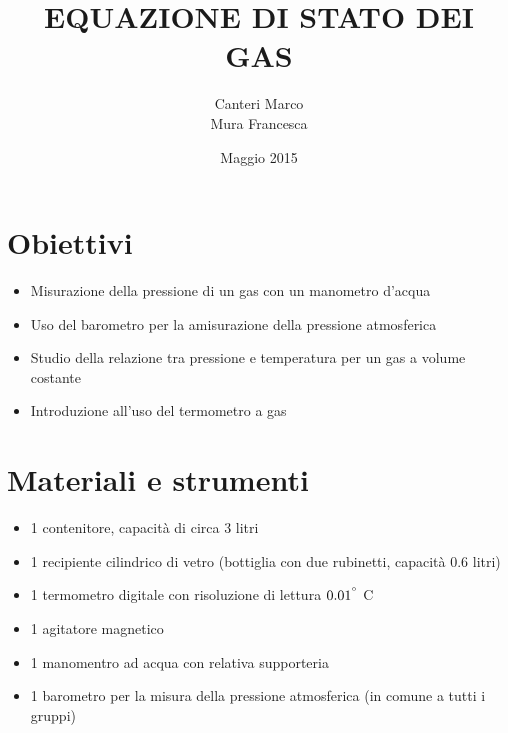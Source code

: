 \documentclass[12pt,titlepage]{article}
\title{\textbf{EQUAZIONE DI STATO DEI GAS} }
\author{Canteri Marco\\Mura Francesca}
\date{Maggio 2015}
\begin{document}
	\maketitle
	\tableofcontents
	\renewcommand{\abstractname}{Abstract}
	
	\begin{abstract}
	
	\end{abstract}
	
\newpage
\section{Obiettivi}
\begin{itemize}
\item Misurazione della pressione di un gas con un manometro d'acqua
\item Uso del barometro per la amisurazione della pressione atmosferica
\item Studio della relazione tra pressione e temperatura per un gas a volume costante
\item Introduzione all'uso del termometro a gas
\end{itemize}

\section{Materiali e strumenti}
\begin{itemize}
\item 1 contenitore, capacità di circa 3 litri
\item 1 recipiente cilindrico di vetro (bottiglia con due rubinetti, capacità 0.6 litri)
\item 1 termometro digitale con risoluzione di lettura $0.01^{\degree}$ C
\item 1 agitatore magnetico
\item 1 manomentro ad acqua con relativa supporteria
\item 1 barometro per la misura della pressione atmosferica (in comune a tutti i gruppi)
\end{itemize}

\newpage

\end{document}
